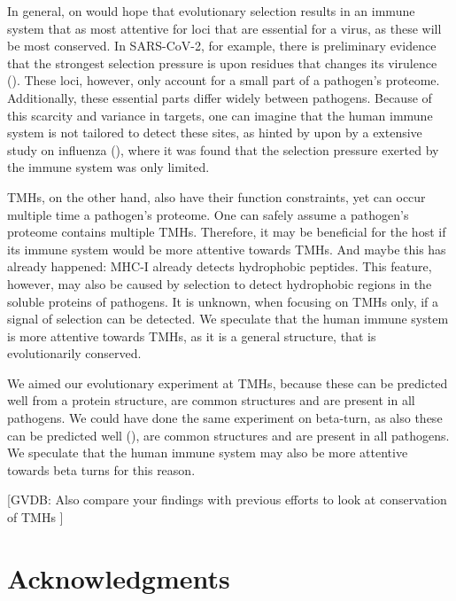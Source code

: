 In general, on would hope that evolutionary selection results in
an immune system that as most attentive for loci that are
essential for a virus, as these will be most conserved.
In SARS-CoV-2, for example, there is preliminary evidence that the strongest
selection pressure is upon residues that changes its 
virulence (\cite{velazquez2020positive}).
These loci, however, only account for a small part of a pathogen's proteome.
Additionally, these essential parts differ widely between pathogens.
Because of this scarcity and variance in targets, 
one can imagine that the human immune system 
is not tailored to detect these sites, 
as hinted by upon by a extensive study on influenza (\cite{han2019individual}),
where it was found that the selection pressure
exerted by the immune system was only limited.
 

TMHs, on the other hand, also have their function constraints, 
yet can occur multiple time a pathogen's proteome.
One can safely assume a pathogen's proteome contains multiple TMHs.
Therefore, it may be beneficial for the host
if its immune system would be more attentive towards TMHs.
And maybe this has already happened: MHC-I already detects hydrophobic
peptides. This feature, however, may also be caused by selection
to detect hydrophobic regions in the soluble proteins of pathogens.
It is unknown, when focusing on TMHs only, if a signal of selection
can be detected.
We speculate that the human immune system is more attentive 
towards TMHs, as it is a general structure, that is evolutionarily conserved.

We aimed our evolutionary experiment at TMHs, because these can
be predicted well from a protein structure,
are common structures and are present in all pathogens. 
We could have done the same experiment on beta-turn,
as also these can be predicted well (\cite{petersen2010netturnp}),
are common structures and are present in all pathogens.
We speculate that the human immune system may also be more attentive 
towards beta turns for this reason.

[GVDB: 
  Also compare your findings with previous efforts 
  to look at conservation of TMHs
]

\section{Acknowledgments}

